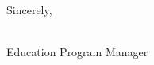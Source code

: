 \documentclass[11pt]{article}%
\def\doctitle{Education Program Manager}%
\begin{document}
\begin{multicols}{2}
\lipsum[1-6]
\end{multicols}

\begin{paracol}{2}\switchcolumn
Sincerely,

 \docfrom \\
 \doctitle\vspace{3ex}

\end{paracol}
\end{document}
